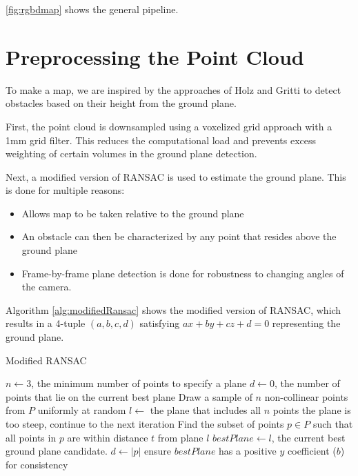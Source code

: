 \autoref{fig:rgbdmap} shows the general pipeline.



\section{Preprocessing the Point Cloud}

To make a map, we are inspired by the approaches of Holz \cite{holz2013towards}
and Gritti \cite{gritti2014kinect} to detect obstacles based on their height
from the ground plane.

First, the point cloud is downsampled using a voxelized grid approach with a 1mm
grid filter. This reduces the computational load and prevents excess weighting of
certain volumes in the ground plane detection.

Next, a modified version of RANSAC is used to estimate the ground plane. This is
done for multiple reasons:
\begin{itemize}
\item Allows map to be taken relative to the ground plane
\item An obstacle can then be characterized by any point that resides above the
ground plane
\item Frame-by-frame plane detection is done for robustness to changing angles of
the camera.
\end{itemize}

Algorithm \autoref{alg:modifiedRansac} shows the modified version of RANSAC,
which results in a 4-tuple $(a,b,c,d)$ satisfying $ax + by + cz + d = 0$
representing the ground plane.

\begin{algorithm}
\caption{Modified RANSAC}
\label{alg:modifiedRansac}
\begin{algorithmic}[1]
\Statex
{}
    \State $n \gets 3$, the minimum number of points to specify a plane
    \State $d \gets 0$, the number of points that lie on the current best plane
        \State Draw a sample of $n$ non-collinear points from $P$ uniformly at random
        \State $l \gets$ the plane that includes all $n$ points
            \State the plane is too steep, continue to the next iteration
        \EndIf
        \State Find the subset of points $p \in P$ such that all points in $p$ are
        within distance $t$ from plane $l$
            \State $bestPlane \gets l$, the current best ground plane candidate.
            \State $d \gets |p|$
        \EndIf
    \EndFor
    \State ensure $bestPlane$ has a positive $y$ coefficient ($b$) for consistency
\EndFunction
\Statex
{}
\end{algorithmic}
\end{algorithm}


